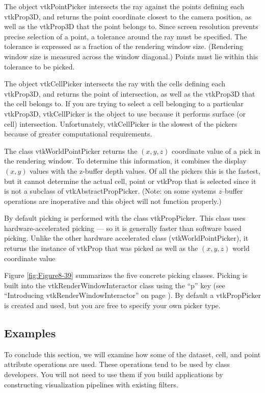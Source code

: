 The object vtkPointPicker intersects the ray against the points defining each vtkProp3D, and returns the point coordinate closest to the camera position, as well as the vtkProp3D that the point belongs to. Since screen resolution prevents precise selection of a point, a tolerance around the ray must be specified. The tolerance is expressed as a fraction of the rendering window size. (Rendering window size is measured across the window diagonal.) Points must lie within this tolerance to be picked.

The object vtkCellPicker intersects the ray with the cells defining each vtkProp3D, and returns the point of intersection, as well as the vtkProp3D that the cell belongs to. If you are trying to select a cell belonging to a particular vtkProp3D, vtkCellPicker is the object to use because it performs surface (or cell) intersection. Unfortunately, vtkCellPicker is the slowest of the pickers because of greater computational requirements.

The class vtkWorldPointPicker returns the $(x,y,z)$ coordinate value of a pick in the rendering window. To determine this information, it combines the display $(x,y)$ values with the z-buffer depth values. Of all the pickers this is the fastest, but it cannot determine the actual cell, point or vtkProp that is selected since it is not a subclass of vtkAbstractPropPicker. (Note: on some systems \emph{z}--buffer operations are inoperative and this object will not function properly.)

By default picking is performed with the class vtkPropPicker. This class uses hardware-accelerated picking --- so it is generally faster than software based picking. Unlike the other hardware accelerated class (vtkWorldPointPicker), it returns the instance of vtkProp that was picked as well as the $(x,y,z)$ world coordinate value

Figure \ref{fig:Figure8-39} summarizes the five concrete picking classes. Picking is built into the vtkRenderWindowInteractor class using the ``p'' key (see ``Introducing vtkRenderWindowInteractor'' on page \pageref{subsec:introducing_vtkRenderWindowInteractor}). By default a vtkPropPicker is created and used, but you are free to specify your own picker type.

\subsection{Examples}

To conclude this section, we will examine how some of the dataset, cell, and point attribute operations are used. These operations tend to be used by class developers. You will not need to use them if you build applications by constructing visualization pipelines with existing filters.

